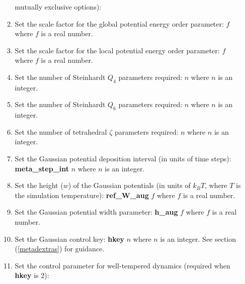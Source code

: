 \begin{enumerate}
\begin{enumerate}
  mutually exclusive options): 
\item Set the scale factor for the global potential energy order parameter:
   $f$ \newline where $f$ is a real number.
\item Set the scale factor for the local potential energy order parameter:
   $f$ \newline where $f$ is a real number.
\item Set the number of Steinhardt $Q_{4}$ parameters required:
   $n$ \newline where $n$ is an integer.
\item Set the number of Steinhardt $Q_{6}$ parameters required:
   $n$ \newline where $n$ is an integer.
\item Set the number of tetrahedral $\zeta$ parameters required:
   $n$ \newline where $n$ is an integer.
\item Set the Gaussian potential deposition interval (in units of time steps): \newline
  {\bf meta\_step\_int} $n$ \newline where $n$ is an integer.
\item Set the height ($w$) of the Gaussian potentials (in units of $k_{B}T$,
  where $T$ is the simulation temperature): \newline
  {\bf ref\_W\_aug} $f$ \newline where $f$ is a real number.
\item Set the Gaussian potential width parameter: \newline
  {\bf h\_aug} $f$ \newline where $f$ is a real number.
\item Set the Gaussian control key: \newline
  {\bf hkey} $n$ \newline where $n$ is an integer. See section
  (\ref{metadextras}) for guidance.
\item Set the control parameter for well-tempered dynamics
  (required when {\bf hkey} is 2): \newline 

\end{enumerate}
\end{enumerate}

